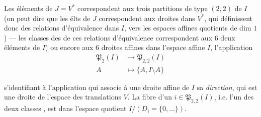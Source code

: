 \documentclass[11pt,a4paper]{article}
\begin{document}
Les  éléments \struck{\ill{}} de $J = V^*$ correspondent aux trois
partitions de type $(2,2)$ de $I$ (on peut  dire que les élts de
$J$ correspondent aux droites  dans $V^*$, qui définissent
 donc des relations d'équivalence dans $I$, vers les
espaces affines quotients de dim $1$) --- les \struck{\ill{}}classes
 des  de ces  relations
d'équivalence correspondent aux 6 
  deux éléments de $I$) ou encore
 aux 6 droites affines dans l'espace affine $I$, l'application
\[
  \begin{aligned}
    \mathfrak{P}_2(I) &\longrightarrow \mathfrak{P}_{2,2}(I) \\
    A &\longmapsto \{A, I \setminus A\}
  \end{aligned}
\]

s'identifiant à l'application qui associe à une droite affine de $I$ sa
\emph{direction}, qui est une droite de l'espace des translations $V$. La
fibre d'un \struck{\ill{}} $i \in \mathfrak{P}_{2,2}(I)$, i.e. l'un des
\struck{\ill{}} deux classes , est dans l'espace
quotient $I/(D_i = \{0, \ldots\})$.
\end{document}
